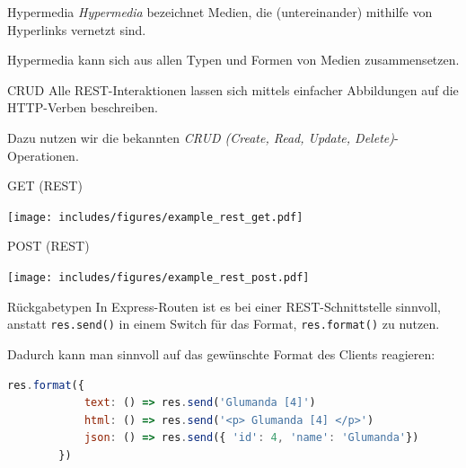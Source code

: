 \begin{defi}{Hypermedia}
    \emph{Hypermedia} bezeichnet Medien, die (untereinander) mithilfe von Hyperlinks vernetzt sind.

    Hypermedia kann sich aus allen Typen und Formen von Medien zusammensetzen.
\end{defi}

\begin{defi}{CRUD}
    Alle REST-Interaktionen lassen sich mittels einfacher Abbildungen auf die HTTP-Verben beschreiben.

    Dazu nutzen wir die bekannten \emph{CRUD (Create, Read, Update, Delete)}-Operationen.
\end{defi}

\begin{example}{GET (REST)}
    \begin{center}
        \texttt{[image: includes/figures/example\_rest\_get.pdf]}
    \end{center}
\end{example}

\begin{example}{POST (REST)}
    \begin{center}
        \texttt{[image: includes/figures/example\_rest\_post.pdf]}
    \end{center}
\end{example}

\begin{bonus}{Rückgabetypen}
    In Express-Routen ist es bei einer REST-Schnittstelle sinnvoll, anstatt \texttt{res.send()} in einem Switch für das Format, \texttt{res.format()} zu nutzen.

    Dadurch kann man sinnvoll auf das gewünschte Format des Clients reagieren:

    \begin{lstlisting}[language=JavaScript]
        res.format({
            text: () => res.send('Glumanda [4]')
            html: () => res.send('<p> Glumanda [4] </p>')
            json: () => res.send({ 'id': 4, 'name': 'Glumanda'})
        })
    \end{lstlisting}
\end{bonus}

